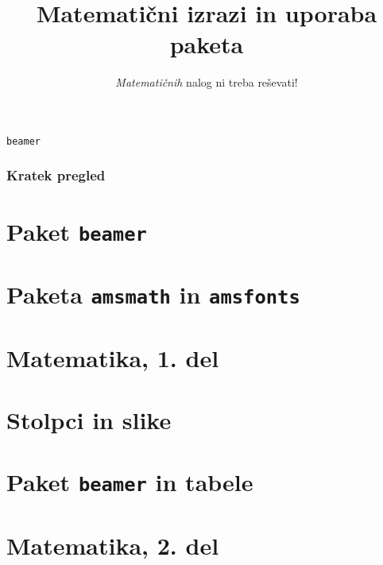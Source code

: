 \documentclass{beamer}
\begin{document}
\title{Matematični izrazi in uporaba paketa} \texttt{beamer}
\subtitle{\emph{Matematičnih} nalog ni treba reševati!}
\date{}

\frame{\titlepage}


\begin{frame}
   \frametitle{Kratek pregled}
   \tableofcontents%
\end{frame}

\section{Paket \texttt{beamer}}


\section{Paketa \texttt{amsmath} in \texttt{amsfonts}}


\section[Matematika, 1. del\\\large{Analiza, logika, množice}]{Matematika, 1. del}

\section{Stolpci in slike}

\section{Paket \texttt{beamer} in tabele}

\section[Matematika, 2. del\\\large{Zaporedja, algebra, grupe}]{Matematika, 2. del}
\end{document}

